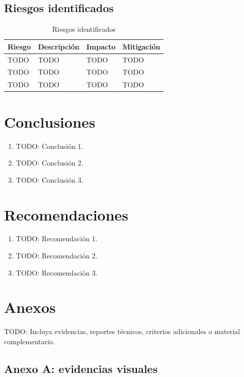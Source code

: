 \documentclass[11pt,spanish]{article}
\begin{document}
\subsection{Riesgos identificados}

\begin{table}[H]
\centering
\caption{Riesgos identificados}
\label{tab:riesgos}
\begin{tabularx}{\textwidth}{p{3cm} Y p{3cm} p{3cm}}
\toprule
\textbf{Riesgo} & \textbf{Descripción} & \textbf{Impacto} & \textbf{Mitigación} \\
\midrule
TODO & TODO & TODO & TODO \\
TODO & TODO & TODO & TODO \\
TODO & TODO & TODO & TODO \\
\bottomrule
\end{tabularx}
\end{table}

\section{Conclusiones}

\begin{enumerate}[label=\arabic*.]
    \item TODO: Conclusión 1.
    \item TODO: Conclusión 2.
    \item TODO: Conclusión 3.
\end{enumerate}

\section{Recomendaciones}

\begin{enumerate}[label=\arabic*.]
    \item TODO: Recomendación 1.
    \item TODO: Recomendación 2.
    \item TODO: Recomendación 3.
\end{enumerate}

\section{Anexos}

TODO: Incluya evidencias, reportes técnicos, criterios adicionales o material complementario.

\subsection{Anexo A: evidencias visuales}
\end{document}
